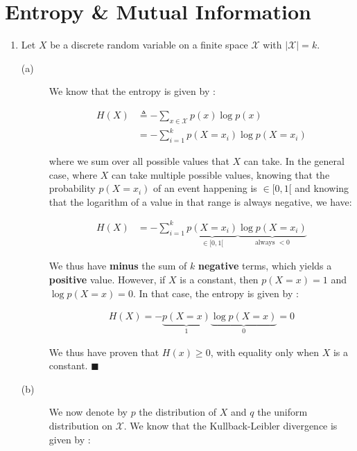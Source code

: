 \documentclass[11pt]{article}
\begin{document}
\section{Entropy \& Mutual Information}\label{sec:num1}

\begin{enumerate}

\item Let $X$ be a discrete random variable on a finite space $\mathcal{X}$ with $|\mathcal{X}| = k$.

	\begin{description}
	
	\item[(a)] We know that the entropy is given by :
	
		\begin{align}
			H(X) & \triangleq -\sum_{x \in \mathcal{X}} p(x) \log p(x) \\
				 & = - \sum_{i = 1}^{k} p(X=x_i) \log p(X=x_i) \nonumber
		\end{align}
		
		where we sum over all possible values that $X$ can take. In the general case, where $X$ can take multiple possible values, knowing that the probability $p(X=x_i)$ of an event happening is $\in [0,1[$ and knowing that the logarithm of a value in that range is always negative, we have:
		
		\begin{align*}
			H(X) & = - \sum_{i = 1}^{k} \underbrace{p(X=x_i)}_{\in [0,1[} \underbrace{\log p(X=x_i)}_{\text{always } <0}
		\end{align*}
		
		We thus have \textbf{minus} the sum of $k$ \textbf{negative} terms, which yields a \textbf{positive} value. However, if $X$ is a constant, then $p(X=x) = 1$ and $\log p(X=x) = 0$. In that case, the entropy is given by :
		
		\begin{align*}
			H(X) = - \underbrace{p(X=x)}_{1} \underbrace{\log p(X=x)}_{0} = 0
		\end{align*}
		
		We thus have proven that $H(x) \geq 0$, with equality only when $X$ is a constant. $\blacksquare$

	
	\item[(b)] We now denote by $p$ the distribution of $X$ and $q$ the uniform distribution on $\mathcal{X}$. We know that the Kullback-Leibler divergence is given by :
	

\end{description}
\end{enumerate}
\end{document}
